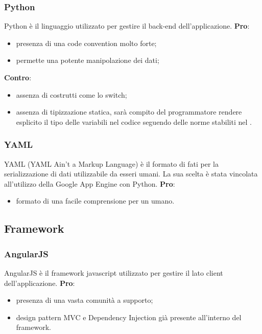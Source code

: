 		\subsubsection{Python} %
		\label{sub:python}
		Python è il linguaggio utilizzato per gestire il back-end dell'applicazione. \newline
		\textbf{Pro}:
			\begin{itemize}
				\item presenza di una code convention molto forte;
				\item permette una potente manipolazione dei dati;
			\end{itemize}
		\noindent
		\newline
		\textbf{Contro}:
			\begin{itemize}
				\item assenza di costrutti come lo switch;
				\item assenza di tipizzazione statica, sarà compito del programmatore rendere esplicito il tipo delle variabili nel codice seguendo delle norme stabiliti nel \docNameVersionNdP.
			\end{itemize}
			\noindent

		\subsubsection{YAML} %
		\label{ssub:yaml}
		YAML (YAML Ain't a Markup Language) è il formato di fati per la serializzazione di dati utilizzabile da esseri umani. \newline
		La sua scelta è stata vincolata all'utilizzo della Google App Engine con Python. \newline
		\textbf{Pro}:
			\begin{itemize}
				\item formato di una facile comprensione per un umano.
			\end{itemize}
		\noindent


	\subsection{Framework} %
	\label{sub:framework}
		\subsubsection{AngularJS} %
		\label{ssub:angularjs}
		AngularJS è il framework javascript utilizzato per gestire il lato client dell'applicazione. \newline
		\textbf{Pro}:
			\begin{itemize}
				\item presenza di una vasta comunità a supporto;
				\item design pattern MVC e Dependency Injection già presente all'interno del framework.
			\end{itemize}
		\noindent

